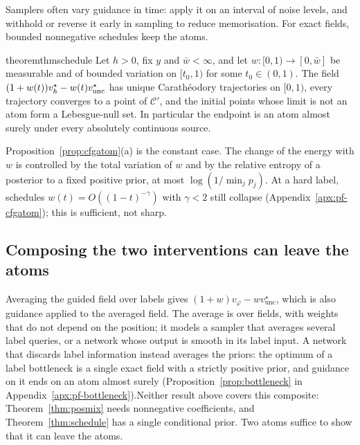 \documentclass{article} %
\newif\ificlr
\theoremstyle{plain}
\theoremstyle{definition}
\theoremstyle{remark}
\begin{document}
\ificlr Samplers often vary guidance in time~\citep{kynkaanniemi2024interval,jain2025attraction};
for exact fields, bounded nonnegative schedules keep the atoms.\else Samplers often vary guidance in time: \citet{kynkaanniemi2024interval} apply it on an interval of
noise levels, and \citet{jain2025attraction} withhold or reverse it early in sampling to reduce
memorisation. For exact fields, bounded nonnegative schedules keep the atoms.\fi

\begin{restatable}{theorem}{thmschedule}
\label{thm:schedule}
Let $h>0$, fix $y$ and $\bar w<\infty$, and let $w:[0,1)\to[0,\bar w]$ be measurable and of
bounded variation on $[t_0,1)$ for some $t_0\in(0,1)$. The field
$(1+w(t))v_h^\star-w(t)v_{\mathrm{unc}}^\star$ has unique Carath\'eodory trajectories on $[0,1)$,
every trajectory converges to a point of $\mathcal C'$, and the initial points whose limit is
not an atom form a Lebesgue-null set. In particular the endpoint is an atom almost surely under
every absolutely continuous source. 
\end{restatable}
\ificlr At a hard label, schedules $w(t)=O((1-t)^{-\gamma})$ with $\gamma<2$ still collapse
(Appendix~\ref{apx:pf-cfgatom}).\else Proposition~\ref{prop:cfgatom}(a) is the constant case. The change of the energy with $w$ is
controlled by the total variation of $w$ and by the relative entropy of a posterior to a fixed
positive prior, at most $\log(1/\min_jp_j)$. At a hard label, schedules
$w(t)=O((1-t)^{-\gamma})$ with $\gamma<2$ still collapse (Appendix~\ref{apx:pf-cfgatom}); this
is sufficient, not sharp.\fi

\subsection{Composing the two interventions can leave the atoms}
\label{sec:composition}

Averaging the guided field over labels gives $(1+w)v_\varphi-wv_{\mathrm{unc}}^\star$, which is
also guidance applied to the averaged field. \ificlr The average is over fields, not priors: the
optimum of a label bottleneck averages the priors, and guidance on it ends on an atom almost
surely (Proposition~\ref{prop:bottleneck}).\else The average is over fields, with weights that do
not depend on the position; it models a sampler that averages several label queries, or a network
whose output is smooth in its label input. A network that discards label information instead
averages the priors: the optimum of a label bottleneck is a single exact field with a strictly
positive prior, and guidance on it ends on an atom almost surely
(Proposition~\ref{prop:bottleneck} in Appendix~\ref{apx:pf-bottleneck}).\fi Neither result above covers this composite:
Theorem~\ref{thm:posmix} needs nonnegative coefficients, and Theorem~\ref{thm:schedule} has a
single conditional prior. Two atoms suffice to show that it can leave the atoms.
\end{document}
